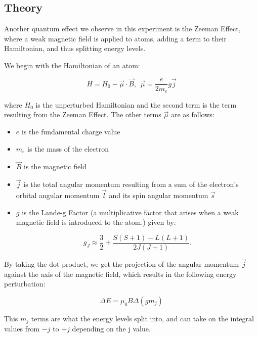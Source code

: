 \subsection{Theory}

Another quantum effect we observe in this experiment is the Zeeman Effect, where a weak magnetic field is applied to atoms, adding a term to their Hamiltonian, and thus splitting energy levels. 

We begin with the Hamiltonian of an atom: 

\begin{equation}
    H = H_0 -\vec{\mu} \cdot \vec{B}, \: \: \vec\mu =\frac{e}{2m_e}g\vec j
  \label{Hamiltonian}
\end{equation}

where $H_0$ is the unperturbed Hamiltonian and the second term is the term resulting from the Zeeman Effect. The other terms $\vec\mu$ are as follows: 

\begin{itemize}
 \item $e$ is the fundamental charge value
 \item $m_e$ is the mass of the electron
 \item $\vec B$ is the magnetic field
 \item $\vec j$ is the total angular momentum resulting from a sum of the electron's orbital angular momentum $\vec l$ and its spin angular momentum $\vec s$
 \item $g$ is the Lande-g Factor (a multiplicative factor that arises when a weak magnetic field is introduced to the atom.) given by:

\begin{equation}
  g_J \approx \frac{3}{2}+\frac{S(S+1)-L(L+1)}{2J(J+1)}. 
  \label{Lande G}
\end{equation}

\end{itemize}

By taking the dot product, we get the projection of the angular momentum $\vec j$ against the axis of the magnetic field, which results in the following energy perturbation:

\begin{equation} 
  \Delta E = \mu_0 B \Delta (g m_j)
  \label{Zeeman Energies}
\end{equation}

This $m_j$ terms are what the energy levels split into, and can take on the integral values from $-j$ to $+j$ depending on the j value. 

